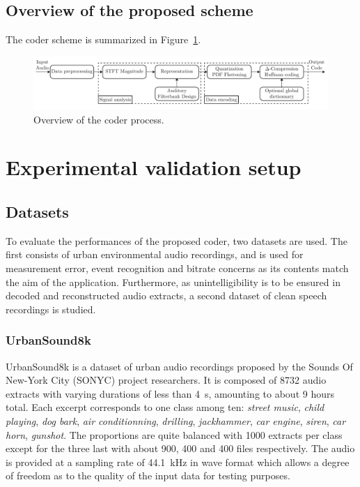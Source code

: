 \documentclass[12pt,times,onecolumn]{article}
\begin{document}
\subsection{Overview of the proposed scheme}
The coder scheme is summarized in Figure~\ref{fig:scheme}.

\begin{figure}[htbp]
	\centering
		\includegraphics[width=1\textwidth]{figures/scheme.pdf}
	\caption{Overview of the coder process.}
	\label{fig:scheme}
\end{figure}
\section{Experimental validation setup}

\subsection{Datasets}
To evaluate the performances of the proposed coder, two datasets are used. The first consists of urban environmental audio recordings, and is used for measurement error, event recognition and bitrate concerns as its contents match the aim of the application. Furthermore, as unintelligibility is to be ensured in decoded and reconstructed audio extracts, a second dataset of clean speech recordings is studied.

\subsubsection{UrbanSound8k}
UrbanSound8k \cite{salamon2014} is a dataset of urban audio recordings proposed by the Sounds Of New-York City (SONYC) project researchers. It is composed of 8732 audio extracts with varying durations of less than 4~s, amounting to about 9 hours total. Each excerpt corresponds to one class among ten: \textit{street music}, \textit{child playing}, \textit{dog bark}, \textit{air conditionning}, \textit{drilling}, \textit{jackhammer}, \textit{car engine}, \textit{siren}, \textit{car horn}, \textit{gunshot}. The proportions are quite balanced with 1000 extracts per class except for the three last with about 900, 400 and 400 files respectively. The audio is provided at a sampling rate of 44.1~kHz in wave format which allows a degree of freedom as to the quality of the input data for testing purposes.\\
\end{document}
